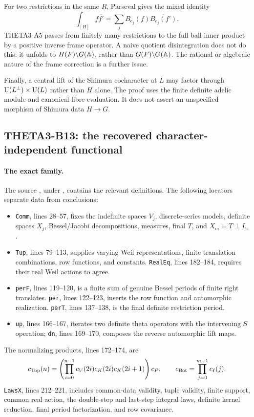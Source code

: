 \documentclass[11pt]{article}
\theoremstyle{definition}\newtheorem{definition}[theorem]{Definition}\newtheorem{remark}[theorem]{Remark}
\begin{document}
For two restrictions in the same $R$, Parseval gives the mixed identity
\[
 \int_{[H]}f\overline{f'}=
 \sum_j B_{e_j}(f)\overline{B_{e_j}(f')}.
\]
THETA3-A5 passes from finitely many restrictions to the full ball inner product by a positive inverse frame operator. A naive quotient disintegration does not do this: it unfolds to $H(F)\backslash G(\mathbb A)$, rather than $G(F)\backslash G(\mathbb A)$. The rational or algebraic nature of the frame correction is a further issue.

Finally, a central lift of the Shimura cocharacter at $L$ may factor through $\operatorname{U}(L^\perp)\times\operatorname{U}(L)$ rather than $H$ alone. The proof uses the finite definite adelic module and canonical-fibre evaluation. It does not assert an unspecified morphism of Shimura data $H\to G$.

\subsection{THETA3-B13: the recovered character-independent functional}\label{B13}

\paragraph{The exact family.}
The source , under
, contains the relevant definitions. The following locators separate data from conclusions:
\begin{itemize}
\item \texttt{Comm}, lines 28--57, fixes the indefinite spaces $V_j$, discrete-series models, definite spaces $X_j$, Bessel/Jacobi decompositions, measures, final $T$, and $X_m=T\perp L_z$.
\item \texttt{Tup}, lines 79--113, supplies varying Weil representations, finite translation combinations, row functions, and constants. \texttt{RealEq}, lines 182--184, requires their real Weil actions to agree.
\item \texttt{perF}, lines 119--120, is a finite sum of genuine Bessel periods of finite right translates. \texttt{per}, lines 122--123, inserts the row function and automorphic realization. \texttt{perT}, lines 137--138, is the final definite restriction period.
\item \texttt{up}, lines 166--167, iterates two definite theta operators with the intervening $S$ operation; \texttt{dn}, lines 169--170, composes the reverse automorphic lift maps.
\end{itemize}
The normalizing products, lines 172--174, are
\[
 c_{\rm Top}(n)=
 \left(\prod_{i=0}^{n-1}c_V(2i)c_K(2i)c_K(2i+1)\right)c_P,
 \qquad
 c_{\rm Bot}=\prod_{j=0}^{m-1}c_I(j).
\]
\texttt{LawsX}, lines 212--221, includes common-data validity, tuple validity, finite support, common real action, the double-step and last-step integral laws, definite kernel reduction, final period factorization, and row covariance.
\end{document}
